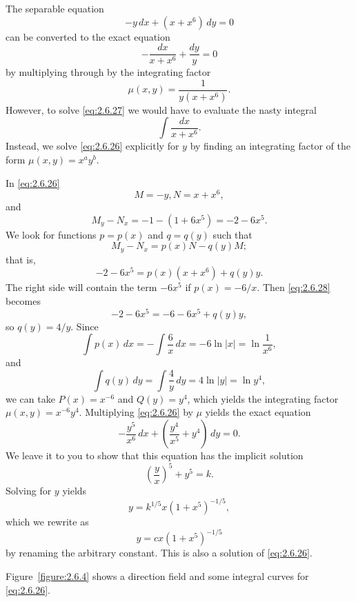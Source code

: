 \documentclass{ximera}
\begin{document}
\begin{example}\label{example:2.6.4}
The separable  equation
\begin{equation}\label{eq:2.6.26}
-y\,dx+(x+x^6)\,dy=0
\end{equation}
can be converted to the exact equation
\begin{equation} \label{eq:2.6.27}
-\frac{dx}{x+x^6}+\frac{dy}{y}=0
\end{equation}
by multiplying through
by the  integrating factor
$$
\mu(x,y)=\frac{1}{y(x+x^6)}.
$$
However, to solve \eqref{eq:2.6.27} %
we would have to evaluate the nasty integral
$$
\int \frac{dx}{x+x^6}.
$$
Instead, we solve \eqref{eq:2.6.26} explicitly for $y$ by finding  an
integrating factor of the form
$\mu(x,y)=x^ay^b$.

In \eqref{eq:2.6.26}
$$
M=-y, N=x+x^6,
$$
and
$$
M_y-N_x=-1-(1+6x^5)=-2-6x^5.
$$
We  look for functions
$p=p(x)$ and $q=q(y)$ such that
$$
M_y-N_x=p(x)N-q(y)M;
$$
that is,
\begin{equation}\label{eq:2.6.28}
-2-6x^5=p(x)(x+x^6)+q(y)y.
\end{equation}
The right side will contain the term $-6x^5$ if $p(x)=-6/x$.   Then
\eqref{eq:2.6.28} becomes
$$
-2-6x^5=-6-6x^5+q(y)y,
$$
so  $q(y)=4/y$.  Since
$$
\int p(x)\,dx=-\int\frac{6}{x}\,dx=-6\ln|x|=\ln\frac{1}{x^6},
$$
 and
$$
\int q(y)\,dy=\int\frac{4}{y}\,dy=4\ln
|y|=\ln{y^4},
$$
we can take $P(x)=x^{-6}$ and $Q(y)=y^4$,
which yields the integrating factor $\mu(x,y)=x^{-6}y^4$.
Multiplying \eqref{eq:2.6.26} by  $\mu$ yields the exact equation
$$
-\frac{y^5}{x^6}\,dx+\left(\frac{y^4}{x^5}+y^4\right)
\,dy=0.
$$
 We leave it to you to 
show that this equation has the implicit solution 
$$
\left(\frac{y}{x}\right)^5+y^5=k.
$$
 Solving for $y$ yields
$$
y=k^{1/5}x(1+x^5)^{-1/5},
$$
which we rewrite as
$$
y=cx(1+x^5)^{-1/5}
$$
by renaming the arbitrary constant.
 This is also a solution of \eqref{eq:2.6.26}.

Figure~\ref{figure:2.6.4} shows a direction field and some integral curves
 for \eqref{eq:2.6.26}.
 

\end{example}
\end{document}
